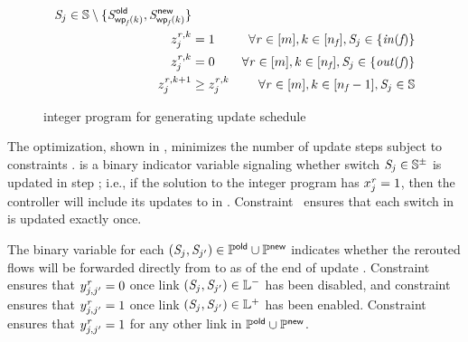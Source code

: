 \begin{figure}[t]
{\begin{minipage}{0.95\linewidth}
\begin{align}
     \switchID{\switchIdx} \in \switchesSet \setminus \{\oldSwitchID{\wpFn{\flowID{}}{\wpIdx}}, \newSwitchID{\wpFn{\flowID{}}{\wpIdx}}\}
    \label{eqn:update:stillToDoEnd} \\
    \todoNF{\updateIdx}{\wpIdx}{\switchIdx} & = 1
    & \forall \updateIdx \in \nats{\switchNmbr}, \wpIdx \in \nats{\wpNmbr{\flowID{}}}, \switchID{\switchIdx} \in \{\inSwitch{\flowID{}}\}
    \label{eqn:update:toDo} \\
    \todoNF{\updateIdx}{\wpIdx}{\switchIdx} & = 0
    & \forall \updateIdx \in \nats{\switchNmbr}, \wpIdx \in \nats{\wpNmbr{\flowID{}}}, \switchID{\switchIdx} \in \{\outSwitch{\flowID{}}\}
    \label{eqn:update:done} \\
    \todoNF{\updateIdx}{\wpIdx+1}{\switchIdx} & \ge \todoNF{\updateIdx}{\wpIdx}{\switchIdx}
    & \forall \updateIdx \in \nats{\switchNmbr}, \wpIdx \in \nats{\wpNmbr{\flowID{}}-1},
    \switchID{\switchIdx} \in \switchesSet
    \label{eqn:update:order}
  \end{align}
\end{minipage}}
\caption{\ourRouteUpdateName integer program for generating update schedule \label{fig:update}}
\end{figure}


The optimization, shown in , minimizes the number
\updateStepsAlt of update steps subject to constraints
.
\switchUpdateInd{\updateIdx}{\switchIdx} is a binary indicator
variable signaling whether switch $\switchID{\switchIdx} \in
\switchesWLinkSwapSet$ is updated in step \updateIdx; i.e., if the
solution to the integer program has
$x^{\mathit{r}}_{j} = 1$, then the controller
will include its updates to \switchID{\switchIdx} in
\updateID{\updateIdx}.  Constraint~
ensures that each switch in \switchesWLinkSwapSet is updated exactly
once.

The binary variable
\linkActiveInd{\updateIdx}{\switchIdx}{\switchIdxAlt} for each
$(\switchID{\switchIdx}, \switchID{\switchIdxAlt}) \in \oldPathNB{} \cup
\newPathNB{}$ indicates whether the rerouted flows will be forwarded
directly from \switchID{\switchIdx} to \switchID{\switchIdxAlt} as of
the end of update \updateID{\updateIdx}.
Constraint~ ensures that
$y^{\mathit{r}}_{{j},{j'}} = 0$ once link
$(\switchID{\switchIdx}, \switchID{\switchIdxAlt}) \in
\disableLinksSet$ has been disabled, and
constraint~ ensures that
$y^{\mathit{r}}_{{j},{j'}} = 1$ once link
$(\switchID{\switchIdx}, \switchID{\switchIdxAlt}) \in
\enableLinksSet$ has been enabled.
Constraint~ ensures that
$y^{\mathit{r}}_{{j},{j'}} = 1$ for any
other link in $\mathbb{P}^{\mathsf{old}}{} \cup \mathbb{P}^{\mathsf{new}}{}$.

